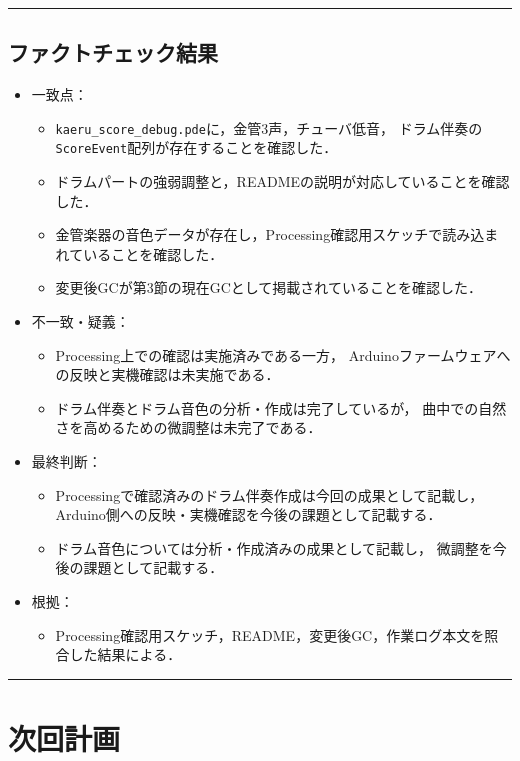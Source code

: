 \documentclass[uplatex,dvipdfmx,a4paper,11pt]{jsarticle}
\newcommand{\sectionrule}{\par\medskip\noindent\rule{\linewidth}{0.6pt}\par\medskip}
\begin{document}
\sectionrule

\subsection{ファクトチェック結果}

\begin{itemize}
  \item 一致点：
    \begin{itemize}
      \item {}\texttt{kaeru\_score\_debug.pde}に，金管3声，チューバ低音，
        ドラム伴奏の\texttt{ScoreEvent}配列が存在することを確認した．
      \item {}ドラムパートの強弱調整と，READMEの説明が対応していることを確認した．
      \item {}金管楽器の音色データが存在し，Processing確認用スケッチで読み込まれていることを確認した．
      \item {}変更後GCが第3節の現在GCとして掲載されていることを確認した．
    \end{itemize}
  \item 不一致・疑義：
    \begin{itemize}
      \item {}Processing上での確認は実施済みである一方，
        Arduinoファームウェアへの反映と実機確認は未実施である．
      \item {}ドラム伴奏とドラム音色の分析・作成は完了しているが，
        曲中での自然さを高めるための微調整は未完了である．
    \end{itemize}
  \item 最終判断：
    \begin{itemize}
      \item {}Processingで確認済みのドラム伴奏作成は今回の成果として記載し，
        Arduino側への反映・実機確認を今後の課題として記載する．
      \item {}ドラム音色については分析・作成済みの成果として記載し，
        微調整を今後の課題として記載する．
    \end{itemize}
  \item 根拠：
    \begin{itemize}
      \item {}Processing確認用スケッチ，README，変更後GC，作業ログ本文を照合した結果による．
    \end{itemize}
\end{itemize}

\sectionrule

\section{次回計画}
\end{document}
